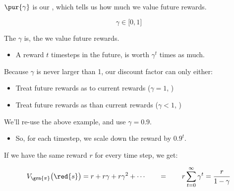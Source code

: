         \begin{definition}
            $\pur{\gamma}$ is our , which tells us how much we value future rewards.

            \begin{equation*}
                \gamma \in \Big[ 0,1 \Big]
            \end{equation*}

            The  $\gamma$ is, the  we value future rewards.

            \begin{itemize}
                \item A reward $t$ timesteps in the future, is worth $\gamma^t$ times as much.
            \end{itemize}

            \subsecdiv

            Because $\gamma$ is never larger than 1, our discount factor can only either:

            \begin{itemize}
                \item Treat future rewards as  to current rewards ($\gamma=1$, )

                \item Treat future rewards as  than current rewards ($\gamma<1$, )
            \end{itemize}
        \end{definition}

        \miniex We'll re-use the above example, and use $\gamma=0.9$. 
        
        \begin{itemize}
            \item So, for each timestep, we scale down the reward by $0.9^{t}$.
        \end{itemize}

        If we have the same reward $r$ for every time step, we get:

        \begin{equation}
            V_{\grn{\pi}}\big(\red{s} \big) = r+ r\gamma + r\gamma^2+\cdots \qquad=\qquad r \sum_{t=0}^\infty \gamma^t = \frac{r}{1-\gamma}
        \end{equation}

